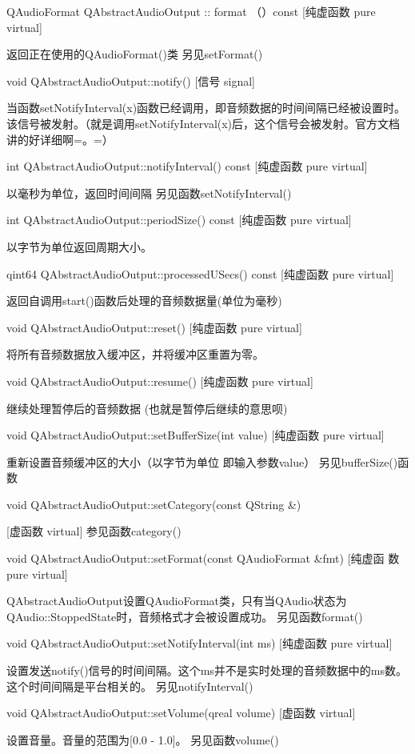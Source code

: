 QAudioFormat QAbstractAudioOutput :: format （）const [纯虚函数 pure
virtual]

返回正在使用的QAudioFormat()类 另见setFormat()

void QAbstractAudioOutput::notify() [信号 signal] 

当函数setNotifyInterval(x)函数已经调用，即音频数据的时间间隔已经被设置时。该信号被发射。（就是调用setNotifyInterval(x)后，这个信号会被发射。官方文档讲的好详细啊=。=）

int QAbstractAudioOutput::notifyInterval() const [纯虚函数 pure
virtual]

以毫秒为单位，返回时间间隔 另见函数setNotifyInterval()

int QAbstractAudioOutput::periodSize() const [纯虚函数 pure virtual] 

以字节为单位返回周期大小。

qint64 QAbstractAudioOutput::processedUSecs() const [纯虚函数 pure
virtual] 

返回自调用start()函数后处理的音频数据量(单位为毫秒)

void QAbstractAudioOutput::reset() [纯虚函数 pure virtual] 

将所有音频数据放入缓冲区，并将缓冲区重置为零。

void QAbstractAudioOutput::resume() [纯虚函数 pure virtual] 

继续处理暂停后的音频数据 (也就是暂停后继续的意思呗)

void QAbstractAudioOutput::setBufferSize(int value) [纯虚函数 pure
virtual]

 重新设置音频缓冲区的大小（以字节为单位 即输入参数value） 另见bufferSize()函数

void QAbstractAudioOutput::setCategory(const QString \&) 

[虚函数 virtual] 参见函数category()

void QAbstractAudioOutput::setFormat(const QAudioFormat \&fmt) [纯虚函
数 pure virtual] 

QAbstractAudioOutput设置QAudioFormat类，只有当QAudio状态为QAudio::StoppedState时，音频格式才会被设置成功。 另见函数format()

void QAbstractAudioOutput::setNotifyInterval(int ms) [纯虚函数 pure
virtual] 

设置发送notify()信号的时间间隔。这个ms并不是实时处理的音频数据中的ms数。
这个时间间隔是平台相关的。
 另见notifyInterval()

void QAbstractAudioOutput::setVolume(qreal volume) [虚函数 virtual] 

设置音量。音量的范围为[0.0 - 1.0]。 另见函数volume()

